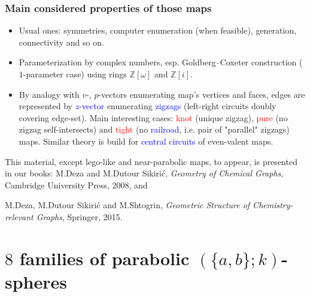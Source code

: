 \documentclass{beamer}
\begin{document}
\begin{frame}\frametitle{Main considered properties of those maps} 
\vspace{-2mm}
\begin{itemize}

\item Usual ones: 
symmetries, computer enumeration (when feasible), generation, connectivity and so on.
\item  Parameterization by complex numbers, esp.   Goldberg--Coxeter construction ($1$-parameter case) using 
 rings 
$\mathbb{Z}[\omega]$ and 
$\mathbb{Z}[i]$.

\item
By analogy with $v$-, $p$-vectors enumerating map's vertices and faces, edges are represented by \textcolor{blue}{
$z$-vector} enumerating \textcolor{blue}{zigzags} (left-right circuits  doubly covering  edge-set). Main interesting  cases: \textcolor{red}{knot} (unique zigzag),
 \textcolor{red}{pure} (no zigzag self-intersects) and  \textcolor{red}{tight} (no \textcolor{blue}{railroad}, i.e. pair of "parallel" zigzags) maps. Similar 
 theory is build for \textcolor{blue}{central circuits} of even-valent 
  maps. 
 \end{itemize} 
This material, except lego-like and near-parabolic maps, to appear,
 is presented  in
  our  books:
M.Deza and M.Dutour Sikiri\'{c}, {\em Geometry of Chemical Graphs}, Cambridge University Press, 2008, and 

M.Deza, M.Dutour Sikiri\'{c} and M.Shtogrin, {\em Geometric Structure of Chemistry-relevant Graphs},
Springer, 2015.
\end{frame}

\section[General]{$8$  families of parabolic $(\{a,b\};k)$-spheres}



\end{document}
